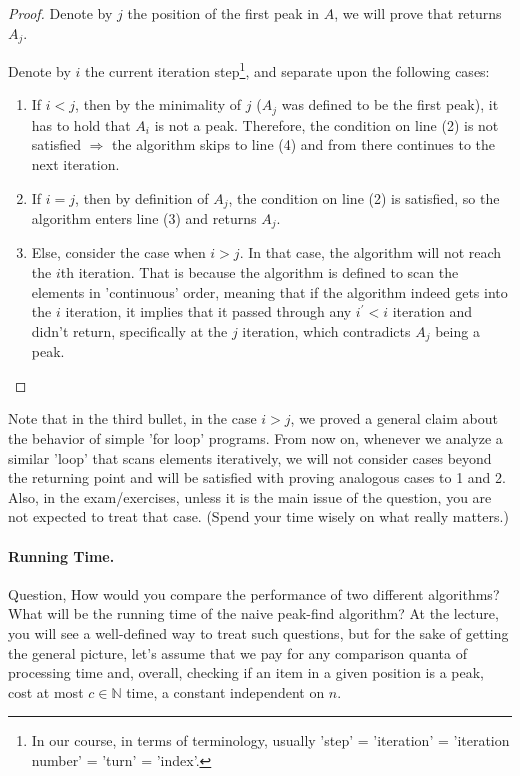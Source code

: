 \begin{proof}
  Denote by $j$ the position of the first peak in $A$, we will prove that  returns $A_{j}$. 

  Denote by $i$ the current iteration step\footnote{ In our course, in terms of terminology, usually 'step' = 'iteration' = 'iteration number' = 'turn' = 'index'. }, and separate upon the following cases: 

  \begin{enumerate}
    \item If $i < j$, then by the minimality of $j$ ($A_{j}$ was defined to be the first peak), it has to hold that $A_{i}$ is not a peak. Therefore, the condition on line (2) is not satisfied $ \Rightarrow $ the algorithm skips to line (4) and from there continues to the next iteration.   
    \item If $i = j$, then by definition of $A_{j}$, the condition on line (2) is satisfied, so the algorithm enters line (3) and returns $A_{j}$.  
    \item Else, consider the case when $i > j$. In that case, the algorithm will not reach the $i$th iteration. That is because the algorithm is defined to scan the elements in 'continuous' order, meaning that if the algorithm indeed gets into the $i$ iteration, it implies that it passed through any $i^\prime < i$ iteration and didn't return, specifically at the $j$ iteration, which contradicts $A_{j}$ being a peak. 
  \end{enumerate}
\end{proof}
Note that in the third bullet, in the case $i>j$, we proved a general claim about the behavior of simple 'for loop' programs. From now on, whenever we analyze a similar 'loop' that scans elements iteratively, we will not consider cases beyond the returning point and will be satisfied with proving analogous cases to 1 and 2. Also, in the exam/exercises, unless it is the main issue of the question, you are not expected to treat that case. (Spend your time wisely on what really matters.)
\paragraph{Running Time.} Question, How would you compare the performance of two different algorithms? What will be the running time of the naive peak-find algorithm? At the lecture, you will see a well-defined way to treat such questions, but for the sake of getting the general picture, let's assume that we pay for any comparison quanta of processing time and, overall, checking if an item in a given position is a peak, cost at most $c\in \mathbb{N}$ time, a constant independent on $n$.

